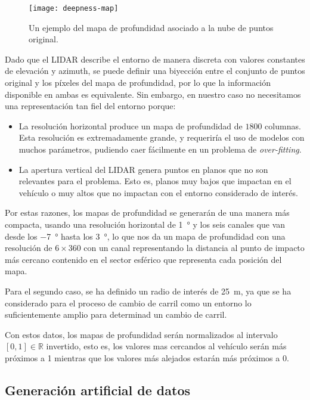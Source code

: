 \begin{figure*}
	\centering
	\texttt{[image: deepness-map]}
	\caption[Ejemplo de un mapa de profundidad]{Un ejemplo del mapa de profundidad asociado a la nube de puntos original.}
	\label{fig:deepmap-example}
\end{figure*}

Dado que el LIDAR describe el entorno de manera discreta con valores constantes de elevación y azimuth, se puede definir una biyección entre el conjunto de puntos original y los píxeles del mapa de profundidad, por lo que la información disponible en ambas es equivalente. Sin embargo, en nuestro caso no necesitamos una representación tan fiel del entorno porque:

\begin{itemize}
	\item La resolución horizontal produce un mapa de profundidad de $1800$ columnas. Esta resolución es extremadamente grande, y requeriría el uso de modelos con muchos parámetros, pudiendo caer fácilmente en un problema de \textit{over-fitting}.
	\item La apertura vertical del LIDAR genera puntos en planos que no son relevantes para el problema. Esto es, planos muy bajos que impactan en el vehículo o muy altos que no impactan con el entorno considerado de interés.
\end{itemize}

Por estas razones, los mapas de profundidad se generarán de una manera más compacta, usando una resolución horizontal de \SI{1}{\degree} y los seis canales que van desde los \SI{-7}{\degree} hasta los \SI{3}{\degree}, lo que nos da un mapa de profundidad con una resolución de $6 \times 360$ con un canal representando la distancia al punto de impacto más cercano contenido en el sector esférico que representa cada posición del mapa.

Para el segundo caso, se ha definido un radio de interés de \SI{25}{\meter}, ya que se ha considerado para el proceso de cambio de carril como un entorno lo suficientemente amplio para determinad un cambio de carril.

Con estos datos, los mapas de profundidad serán normalizados al intervalo $[0, 1] \in \mathbb{R}$ invertido, esto es, los valores mas cercandos al vehículo serán más próximos a 1 mientras que los valores más alejados estarán más próximos a 0.

\subsection{Generación artificial de datos}

